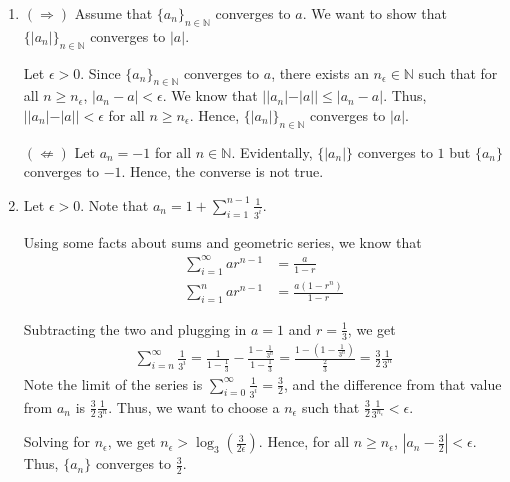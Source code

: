 \documentclass[12pt]{article}
\begin{document}

\begin{enumerate}[start=1,label={\bfseries Problem \arabic*:},leftmargin=1in] %
    \item $(\Rightarrow)$ Assume that $\{ a_{n} \}_{n \in \mathbb{N}}$ converges to $a$. We want to show that $\{ |a_{n}| \}_{n \in \mathbb{N}}$ converges to $|a|$.
    
    Let $\epsilon > 0$. Since $\{ a_{n} \}_{n \in \mathbb{N}}$ converges to $a$, there exists an $n_{\epsilon} \in \mathbb{N}$ such that for all $n \geq n_{\epsilon}$, $|a_{n} - a| < \epsilon$.
    We know that $||a_{n}| - |a|| \leq |a_{n} - a|$. Thus, $||a_{n}| - |a|| < \epsilon$ for all $n \geq n_{\epsilon}$. Hence, $\{ |a_{n}| \}_{n \in \mathbb{N}}$ converges to $|a|$.
    
    $(\nLeftarrow)$ Let $a_{n} = -1$ for all $n \in \mathbb{N}$. Evidentally, $\{|a_{n}|\}$ converges to $1$ but $\{a_{n}\}$ converges to $-1$. Hence, the converse is not true.

    \item Let $\epsilon > 0$. Note that $a_{n} = 1 + \sum^{n-1}_{i=1} \frac{1}{3^{i}}$. 
    
    Using some facts about sums and geometric series, we know that 
    \begin{align*}
        \sum^{\infty}_{i=1} ar^{n-1} &= \frac{a}{1-r}\\
        \sum^{n}_{i=1} ar^{n-1} &= \frac{a(1-r^{n})}{1-r}
    \end{align*}

    Subtracting the two and plugging in $a = 1$ and $r = \frac{1}{3}$, we get
    \begin{align*}
        \sum^{\infty}_{i=n} \frac{1}{3^{i}} = \frac{1}{1-\frac{1}{3}} - \frac{1-\frac{1}{3^{n}}}{1-\frac{1}{3}} = \frac{1-(1-\frac{1}{3^{n}})}{\frac{2}{3}} = \frac{3}{2}\frac{1}{3^{n}}
    \end{align*}
    Note the limit of the series is $ \sum^{\infty}_{i=0} \frac{1}{3^{i}} = \frac{3}{2}$, and the difference from that value from $a_{n}$ is $\frac{3}{2}\frac{1}{3^{n}}$. Thus, we want to choose a $n_{\epsilon}$ such that $\frac{3}{2}\frac{1}{3^{n_{\epsilon}}} < \epsilon$.

    Solving for $n_{\epsilon}$, we get $n_{\epsilon} > \log_{3}(\frac{3}{2\epsilon})$. Hence, for all $n \geq n_{\epsilon}$, $|a_{n} - \frac{3}{2}| < \epsilon$. Thus, $\{a_{n}\}$ converges to $\frac{3}{2}$.


\end{enumerate}
\end{document}

